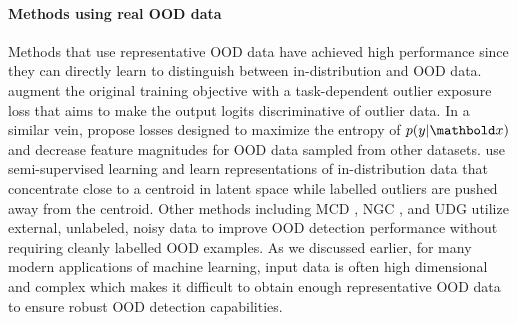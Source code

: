 \paragraph{Methods using real OOD data}
Methods that use representative OOD data have achieved high performance since they can directly learn to distinguish between in-distribution and OOD data. 
\textcite{hendrycks_deep_2019} augment the original training objective with a task-dependent outlier exposure loss that aims to make the output logits discriminative of outlier data. 
In a similar vein, \textcite{dhamija_reducing_2018} propose losses designed to maximize the entropy of $p(y|\xb)$ and decrease feature magnitudes for OOD data sampled from other datasets. 
\textcite{ruff_deep_2020} use semi-supervised learning and learn representations of in-distribution data that concentrate close to a centroid in latent space while labelled outliers are pushed away from the centroid. 
Other methods including MCD \parencite{yu_unsupervised_2019}, NGC \parencite{wu_ngc_2021}, and UDG \parencite{yang_semantically_2021} utilize external, unlabeled, noisy data to improve OOD detection performance without requiring cleanly labelled OOD examples. 
As we discussed earlier, for many modern applications of machine learning, input data is often high dimensional and complex which makes it difficult to obtain enough representative OOD data to ensure robust OOD detection capabilities. 

